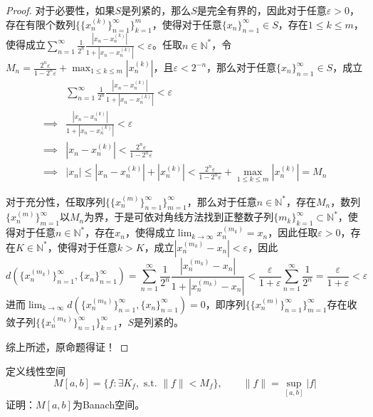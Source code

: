 \documentclass[lang = cn, scheme = chinese, 10pt]{elegantbook}
\newcommand{\N}{\mathbb{N}}  %
\newcommand{\sub}{\subset}   %
\begin{document}
\begin{proof}
	对于必要性，如果$S$是列紧的，那么$S$是完全有界的，因此对于任意$\varepsilon>0$，存在有限个数列$\{ \{x_n^{(k)}\}_{n=1}^{\infty} \}_{k=1}^{m}$，使得对于任意$\{x_n\}_{n=1}^{\infty}\in S$，存在$1\le k\le m$，使得成立$\displaystyle\sum_{n=1}^{\infty}\frac{1}{2^n}\frac{|x_n-x_n^{(k)}|}{1+|x_n-x_n^{(k)}|}<\varepsilon$。任取$n\in\N^*$，令$\displaystyle M_n=\frac{2^n\varepsilon}{1-2^n\varepsilon}+\max_{1\le k\le m}|x_n^{(k)}|$，且$\varepsilon<2^{-n}$，那么对于任意$\{x_n\}_{n=1}^{\infty}\in S$，成立
	\nonumber\begin{align}
		&\sum_{n=1}^{\infty}\frac{1}{2^n}\frac{|x_n-x_n^{(k)}|}{1+|x_n-x_n^{(k)}|}<\varepsilon\\
		\implies&\frac{|x_n-x_n^{(k)}|}{1+|x_n-x_n^{(k)}|}<\varepsilon\\
		\implies&|x_n-x_n^{(k)}|<\frac{2^n\varepsilon}{1-2^n\varepsilon}\\
		\implies&|x_n|\le|x_n-x_n^{(k)}|+|x_n^{(k)}|<\frac{2^n\varepsilon}{1-2^n\varepsilon}+\max_{1\le k\le m}|x_n^{(k)}|=M_n
	\end{align}
	
	对于充分性，任取序列$\{ \{x_n^{(m)}\}_{n=1}^{\infty} \}_{m=1}^{\infty}$，那么对于任意$n\in\N^*$，存在$M_n$，数列$\{x_n^{(m)}\}_{m=1}^{\infty}$以$M_n$为界，于是可依对角线方法找到正整数子列$\{m_k\}_{k=1}^{\infty}\sub\N^*$，使得对于任意$n\in\N^*$，存在$x_n$，使得成立$\displaystyle\lim_{k\to\infty}x_n^{(m_k)}=x_n$，因此任取$\varepsilon>0$，存在$K\in\N^*$，使得对于任意$k>K$，成立$|x_n^{(m_k)}-x_n|<\varepsilon$，因此
	$$
	d(\{ x_n^{(m_k)} \}_{n=1}^{\infty},\{x_n\}_{n=1}^{\infty})=\sum_{n=1}^{\infty}\frac{1}{2^n}\frac{|x_n^{(m_k)}-x_n|}{1+|x_n^{(m_k)}-x_n|}<\frac{\varepsilon}{1+\varepsilon}\sum_{n=1}^{\infty}\frac{1}{2^n}=\frac{\varepsilon}{1+\varepsilon}<\varepsilon
	$$
	进而$\displaystyle \lim_{k\to\infty}d(\{ x_n^{(m_k)} \}_{n=1}^{\infty},\{x_n\}_{n=1}^{\infty})=0$，即序列$\{ \{x_n^{(m)}\}_{n=1}^{\infty} \}_{m=1}^{\infty}$存在收敛子列$\{ \{x_n^{(m_k)}\}_{n=1}^{\infty} \}_{k=1}^{\infty}$，$S$是列紧的。
	
	综上所述，原命题得证！
\end{proof}

\begin{proposition}
	定义线性空间
	$$
	M[a,b]=\{ f:\exists K_f,\text{ s.t. }\|f\|<M_f \},\qquad 
	\|f\|=\sup_{[a,b]}|f|
	$$
	证明：$M[a,b]$为Banach空间。
\end{proposition}
\end{document}
